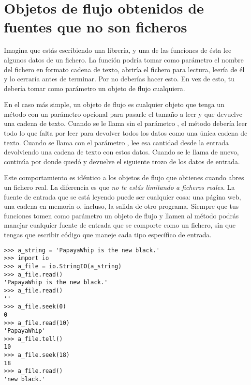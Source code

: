 \section{Objetos de flujo obtenidos de fuentes que no son ficheros}

Imagina que estás escribiendo una librería, y una de las funciones de ésta lee algunos datos de un fichero. La función podría tomar como parámetro el nombre del fichero en formato cadena de texto, abriría el fichero para lectura, leería de él y lo cerraría antes de terminar. Por no deberías hacer esto. En vez de esto, tu  debería tomar como parámetro un objeto de flujo cualquiera.


En el caso más simple, un objeto de flujo es cualquier objeto que tenga un método  con un parámetro opcional  para pasarle el tamaño a leer y que devuelve una cadena de texto. Cuando se le llama sin el parámetro , el método  debería leer todo lo que falta por leer para devolver todos los datos como una única cadena de texto. Cuando se llama con el parámetro , lee esa cantidad desde la entrada devolviendo una cadena de texto con estos datos. Cuando se le llama de nuevo, continúa por donde quedó y devuelve el siguiente trozo de los datos de entrada.

Este comportamiento es idéntico a los objetos de flujo que obtienes cuando abres un fichero real. La diferencia es que \emph{no te estás limitando a ficheros reales}. La fuente de entrada que se está leyendo puede ser cualquier cosa: una página web, una cadena en memoria o, incluso, la salida de otro programa. Siempre que tus funciones tomen como parámetro un objeto de flujo y llamen al método  podrás manejar cualquier fuente de entrada que se comporte como un fichero, sin que tengas que escribir código que maneje cada tipo específico de entrada.

\noindent\begin{minipage}{\textwidth}
\begin{lstlisting}[mathescape=True]
>>> a_string = 'PapayaWhip is the new black.'
>>> import io 
>>> a_file = io.StringIO(a_string)
>>> a_file.read()               
'PapayaWhip is the new black.'
>>> a_file.read()              
''
>>> a_file.seek(0)            
0
>>> a_file.read(10)          
'PapayaWhip'
>>> a_file.tell()                       
10
>>> a_file.seek(18)
18
>>> a_file.read()
'new black.'
\end{lstlisting}
\end{minipage}

